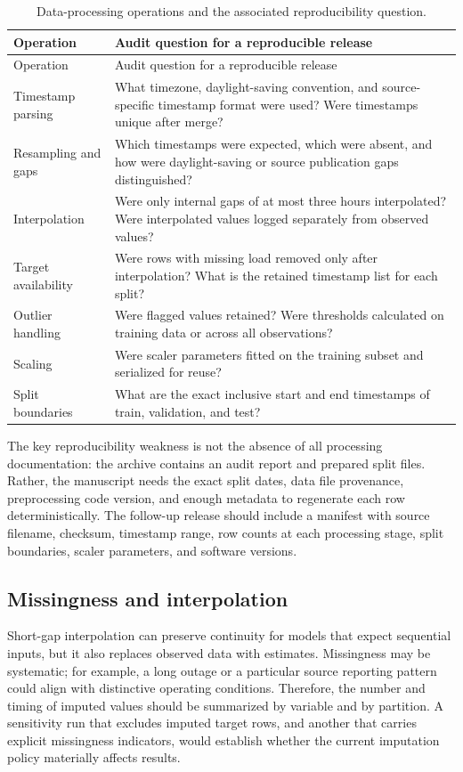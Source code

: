 \documentclass[12pt,a4paper]{article}
\begin{document}
\begin{longtable}{p{.23\linewidth}p{.69\linewidth}}
\caption{Data-processing operations and the associated reproducibility question.}\\
\toprule Operation & Audit question for a reproducible release \\\midrule\endfirsthead
\toprule Operation & Audit question for a reproducible release \\\midrule\endhead
Timestamp parsing & What timezone, daylight-saving convention, and source-specific timestamp format were used? Were timestamps unique after merge?\\
Resampling and gaps & Which timestamps were expected, which were absent, and how were daylight-saving or source publication gaps distinguished?\\
Interpolation & Were only internal gaps of at most three hours interpolated? Were interpolated values logged separately from observed values?\\
Target availability & Were rows with missing load removed only after interpolation? What is the retained timestamp list for each split?\\
Outlier handling & Were flagged values retained? Were thresholds calculated on training data or across all observations?\\
Scaling & Were scaler parameters fitted on the training subset and serialized for reuse?\\
Split boundaries & What are the exact inclusive start and end timestamps of train, validation, and test?\\
\bottomrule\end{longtable}

The key reproducibility weakness is not the absence of all processing documentation: the archive contains an audit report and prepared split files. Rather, the manuscript needs the exact split dates, data file provenance, preprocessing code version, and enough metadata to regenerate each row deterministically. The follow-up release should include a manifest with source filename, checksum, timestamp range, row counts at each processing stage, split boundaries, scaler parameters, and software versions.

\subsection{Missingness and interpolation}
Short-gap interpolation can preserve continuity for models that expect sequential inputs, but it also replaces observed data with estimates. Missingness may be systematic; for example, a long outage or a particular source reporting pattern could align with distinctive operating conditions. Therefore, the number and timing of imputed values should be summarized by variable and by partition. A sensitivity run that excludes imputed target rows, and another that carries explicit missingness indicators, would establish whether the current imputation policy materially affects results.
\end{document}
